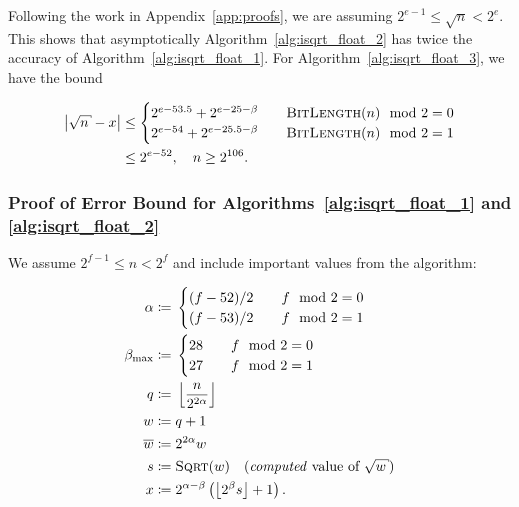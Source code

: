 \noindent
Following the work in Appendix~\ref{app:proofs},
we are assuming $2^{e-1}\le \sqrt{n} < 2^{e}$.
This shows that asymptotically
Algorithm~\ref{alg:isqrt_float_2} has twice the accuracy of
Algorithm~\ref{alg:isqrt_float_1}.
For Algorithm~\ref{alg:isqrt_float_3}, we have the bound

\begin{align}
    \abs{\sqrt{n} - x} &\le \begin{cases}
        2^{e-53.5} + 2^{e-25-\beta} &\quad \textsc{BitLength}(n) \mod 2 = 0   \\
        2^{e-54}   + 2^{e-25.5-\beta} &\quad \textsc{BitLength}(n) \mod 2 = 1 \\
    \end{cases} \nonumber\\
    &\le 2^{e-52}, \quad n\ge 2^{106}.
\end{align}


\subsubsection*{Proof of Error Bound for Algorithms~\ref{alg:isqrt_float_1} and \ref{alg:isqrt_float_2}}

We assume $2^{f-1} \le n < 2^{f}$ and
include important values from the algorithm:

\begin{align}
    \alpha &\algAssign{} \begin{cases}
        (f - 52)/2 &\quad f\mod 2 = 0 \\
        (f - 53)/2 &\quad f\mod 2 = 1 \\
        \end{cases}
        \nonumber\\
    \beta_{\max} &\algAssign{} \begin{cases}
        28 &\quad f\mod 2 = 0 \\
        27 &\quad f\mod 2 = 1 \\
        \end{cases}
        \nonumber\\
    q &\algAssign{} \floor{\frac{n}{2^{2\alpha}}}
        \nonumber\\
    w &\algAssign{} q + 1
        \nonumber\\
    \overline{w} &\algAssign{} 2^{2\alpha}w
        \nonumber\\
    s &\algAssign{} \textsc{Sqrt}(w)\quad
        \text{(\emph{computed} value of $\sqrt{w}$)}
        \nonumber\\
    x &\algAssign{} 2^{\alpha-\beta}\parens{\floor{2^{\beta}s} + 1}.
\end{align}

